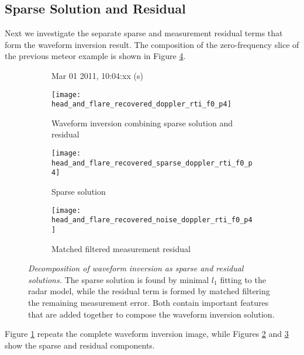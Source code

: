 \subsection{Sparse Solution and Residual}
Next we investigate the separate sparse and measurement residual terms that form the waveform inversion result. The composition of the zero-frequency slice of the previous meteor example is shown in Figure \ref{fig:recovered_solution_composition}.
\begin{figure}[tpb]
 \vspace{-1.5\baselineskip}
 \begin{subfigure}{\textwidth}
  \centering
  \textsf{\footnotesize Mar 01 2011, 10:04:xx (s)}
  
  \texttt{[image: head\_and\_flare\_recovered\_doppler\_rti\_f0\_p4]}
  \caption{Waveform inversion combining sparse solution and residual}
  \label{fig:recovered_total}
 \end{subfigure}
 
 \vspace{0.5\baselineskip}
 \begin{subfigure}{\textwidth}
  \centering
  \texttt{[image: head\_and\_flare\_recovered\_sparse\_doppler\_rti\_f0\_p4]}
  \caption{Sparse solution}
  \label{fig:recovered_sparse}
 \end{subfigure}
 
 \vspace{0.5\baselineskip}
 \begin{subfigure}{\textwidth}
  \centering
  \texttt{[image: head\_and\_flare\_recovered\_noise\_doppler\_rti\_f0\_p4]}
  \caption{Matched filtered measurement residual}
  \label{fig:recovered_noise}
 \end{subfigure}
 \caption[Decomposition of waveform inversion as sparse and residual solutions]{\emph{Decomposition of waveform inversion as sparse and residual solutions.} The sparse solution is found by minimal $l_1$ fitting to the radar model, while the residual term is formed by matched filtering the remaining measurement error. Both contain important features that are added together to compose the waveform inversion solution.}
 \label{fig:recovered_solution_composition}
\end{figure}%
Figure \ref{fig:recovered_total} repeats the complete waveform inversion image, while Figures \ref{fig:recovered_sparse} and \ref{fig:recovered_noise} show the sparse and residual components.

